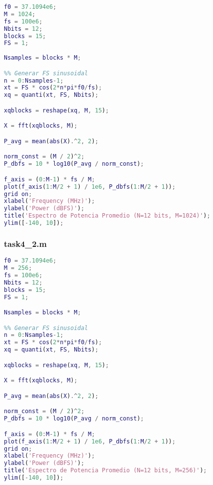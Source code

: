 \begin{lstlisting}[language=Matlab]
f0 = 37.1094e6;
M = 1024;
fs = 100e6;
Nbits = 12;
blocks = 15;
FS = 1;
                                                                                                                                                                                                                                                                                                                                                                                                                                                                                                                                                                                                                                                    
Nsamples = blocks * M;

%% Generar FS sinusoidal
n = 0:Nsamples-1;
xt = FS * cos(2*n*pi*f0/fs);
xq = quanti(xt, FS, Nbits);

xqblocks = reshape(xq, M, 15);

X = fft(xqblocks, M);

P_avg = mean(abs(X).^2, 2);

norm_const = (M / 2)^2;
P_dbfs = 10 * log10(P_avg / norm_const);

f_axis = (0:M-1) * fs / M; 
plot(f_axis(1:M/2 + 1) / 1e6, P_dbfs(1:M/2 + 1));
grid on;
xlabel('Frequency (MHz)');
ylabel('Power (dBFS)');
title('Espectro de Potencia Promedio (N=12 bits, M=1024)');
ylim([-140, 10]);
\end{lstlisting}


\subsubsection{task4\_2.m}
\begin{lstlisting}[language=Matlab]
f0 = 37.1094e6;
M = 256;
fs = 100e6;
Nbits = 12;
blocks = 15;
FS = 1;

Nsamples = blocks * M;

%% Generar FS sinusoidal
n = 0:Nsamples-1;
xt = FS * cos(2*n*pi*f0/fs);
xq = quanti(xt, FS, Nbits);

xqblocks = reshape(xq, M, 15);

X = fft(xqblocks, M);

P_avg = mean(abs(X).^2, 2);

norm_const = (M / 2)^2;
P_dbfs = 10 * log10(P_avg / norm_const);

f_axis = (0:M-1) * fs / M;
plot(f_axis(1:M/2 + 1) / 1e6, P_dbfs(1:M/2 + 1));
grid on;
xlabel('Frequency (MHz)');
ylabel('Power (dBFS)');
title('Espectro de Potencia Promedio (N=12 bits, M=256)');
ylim([-140, 10]);
\end{lstlisting}


